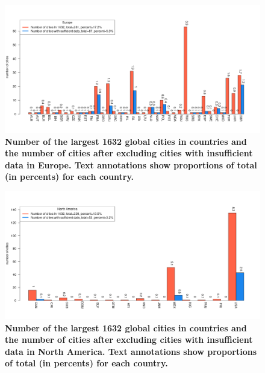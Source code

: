 \documentclass[preprint,10pt]{elsarticle} %
\begin{document}
{\begin{figure}
\centering
\includegraphics[trim={ 0 35 25 50 },clip,scale=0.45]{Images2/Europe_cities_Rev2.png}
\caption{\bf Number of the largest 1632 global cities in countries and the number of cities after excluding cities with insufficient data in Europe. Text annotations show proportions of total (in percents) for each country.}
 \label{fig:europe}
\end{figure}

\begin{figure}
\centering
\includegraphics[trim={ 0 35 25 50 },clip,scale=0.45]{Images2/North America_cities_Rev2.png}
\caption{\bf Number of the largest 1632 global cities in countries and the number of cities after excluding cities with insufficient data in North America. Text annotations show proportions of total (in percents) for each country.}
 \label{fig:northamerica}
\end{figure}

}
\end{document}

